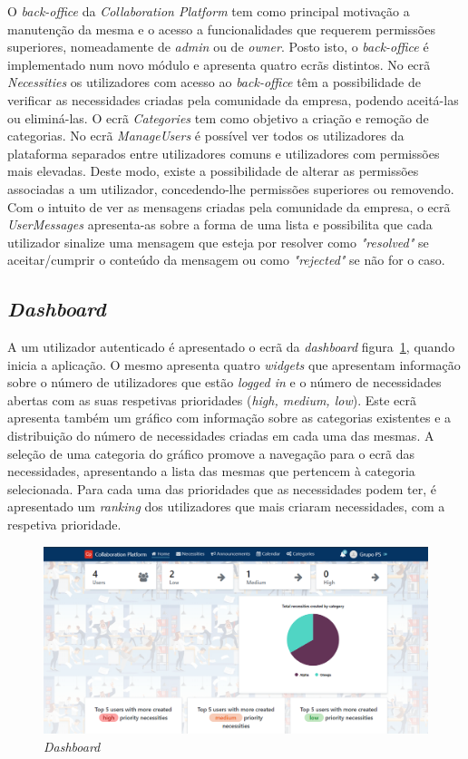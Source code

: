 O \textit{back-office} da \textit{Collaboration Platform} tem como principal motivação a manutenção da mesma e o acesso a funcionalidades que requerem permissões superiores, nomeadamente de \textit{admin} ou de \textit{owner}.
Posto isto, o \textit{back-office} é implementado num novo módulo e apresenta quatro ecrãs distintos. 
No ecrã \textit{Necessities} os utilizadores com acesso ao \textit{back-office} têm a possibilidade de verificar as necessidades criadas pela comunidade da empresa, podendo aceitá-las ou eliminá-las. 
O ecrã \textit{Categories} tem como objetivo a criação e remoção de categorias. 
No ecrã \textit{ManageUsers} é possível ver todos os utilizadores da plataforma separados entre utilizadores comuns e utilizadores com permissões mais elevadas.
Deste modo, existe a possibilidade de alterar as permissões associadas a um utilizador, concedendo-lhe permissões superiores ou removendo. 
Com o intuito de ver as mensagens criadas pela comunidade da empresa, o ecrã \textit{UserMessages} apresenta-as sobre a forma de uma lista e possibilita que cada utilizador sinalize uma mensagem que esteja por resolver como \textit{"resolved"} se aceitar/cumprir o conteúdo da mensagem ou como \textit{"rejected"} se não for o caso.  



\subsection{\textit{Dashboard}}\label{subsec:implementacao:dashboard}

A um utilizador autenticado é apresentado o ecrã da \textit{dashboard} figura~\ref{fig:Dashboard}, quando inicia a aplicação.
O mesmo apresenta quatro \textit{widgets} que apresentam informação sobre o número de utilizadores que estão \textit{logged in} e o número de necessidades abertas com as suas respetivas prioridades (\textit{high, medium, low}).
Este ecrã apresenta também um gráfico com informação sobre as categorias existentes e a distribuição do número de necessidades criadas em cada uma das mesmas.
A seleção de uma categoria do gráfico promove a navegação para o ecrã das necessidades,  apresentando a lista das mesmas que pertencem à categoria selecionada.
Para cada uma das prioridades que as necessidades podem ter, é apresentado um \textit{ranking} dos utilizadores que mais criaram necessidades, com a respetiva prioridade.

\begin{figure}[H]
  \centering 
  \includegraphics[scale=0.4]{figures/Dashboard.png}
  \caption{\textit{Dashboard}}\label{fig:Dashboard}
\end{figure}


